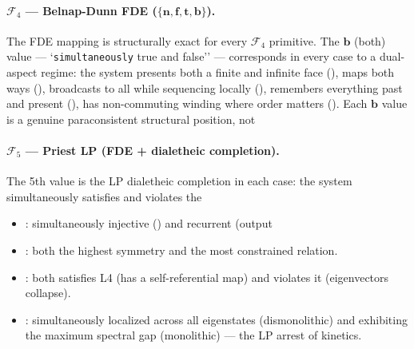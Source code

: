 \documentclass[12pt,a4paper]{article}
\makeatletter
\renewcommand{\_}{\ig@origunderscore\discretionary{}{}{}}
\makeatother
\begin{document}
\paragraph{$\mathcal{F}_4$ --- Belnap-Dunn FDE ($\{\mathbf{n}, \mathbf{f}, \mathbf{t},
\mathbf{b}\}$).}
The FDE mapping is structurally exact for every $\mathcal{F}_4$ primitive. The $\mathbf{b}$ (both) value ---
`\texttt{simultaneously} true and false'' --- corresponds in every case to a dual-aspect regime: the system presents both a
finite and infinite face (), maps both ways (), broadcasts to all while sequencing
locally (), remembers everything past and present (), has non-commuting winding
where order matters (). Each $\mathbf{b}$ value is a genuine paraconsistent structural position, not
\paragraph{$\mathcal{F}_5$ --- Priest LP (FDE + dialetheic completion).}
The 5th value is the LP dialetheic completion in each case: the system simultaneously satisfies and violates the

\begin{itemize}
 \item {}: simultaneously injective () and recurrent (output
 \item {}: both the highest symmetry and the most constrained relation.
 \item {}: both satisfies L4 (has a self-referential map) and violates it
 (eigenvectors collapse).
 \item {}: simultaneously localized across all eigenstates (dismonolithic) and exhibiting the
maximum spectral gap (monolithic) --- the LP arrest of kinetics.
\end{itemize}
\end{document}

